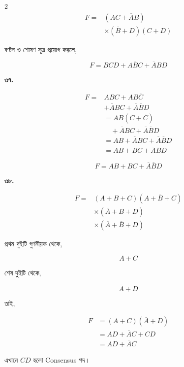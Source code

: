\begin{multicols}{2}
\[
\begin{aligned}
F
={}&(AC+\overline AB)\\
&\times(\overline B+D)(C+D)
\end{aligned}
\]

বণ্টন ও শোষণ সূত্র প্রয়োগ করলে,

\[
\boxed{F=BCD+A\overline BC+\overline ABD}
\]

\medskip


\textbf{৩৭.}

\[
\begin{aligned}
F
={}&ABC+AB\overline C\\
&+\overline ABC+\overline A\overline BD\\
&=AB(C+\overline C)\\
&\quad+\overline ABC+\overline A\overline BD\\
&=AB+\overline ABC+\overline A\overline BD\\
&=AB+BC+\overline A\overline BD
\end{aligned}
\]

\[
\boxed{F=AB+BC+\overline A\overline BD}
\]

\medskip


\textbf{৩৮.}

\[
\begin{aligned}
F
={}&(A+B+C)(A+\overline B+C)\\
&\times(\overline A+B+D)\\
&\times(\overline A+\overline B+D)
\end{aligned}
\]

প্রথম দুইটি গুণনীয়ক থেকে,

\[
A+C
\]

শেষ দুইটি থেকে,

\[
\overline A+D
\]

তাই,

\[
\begin{aligned}
F
&=(A+C)(\overline A+D)\\
&=AD+\overline AC+CD\\
&=AD+\overline AC
\end{aligned}
\]

এখানে \(CD\) হলো \textenglish{Consensus} পদ।


\end{multicols}
